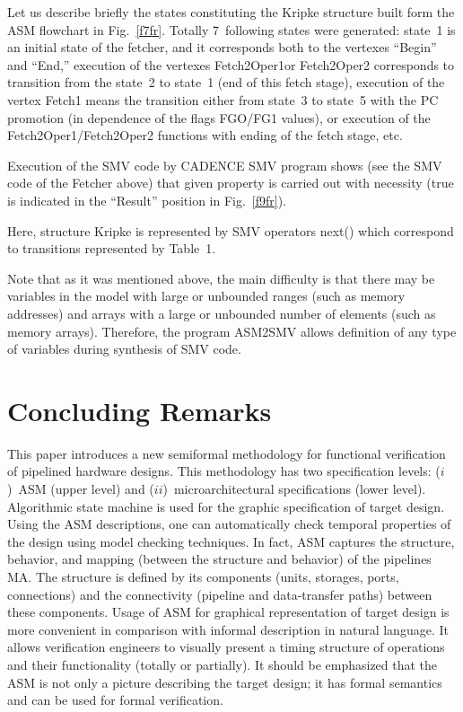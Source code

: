 \begin{multicols}{2}
       Let us describe briefly the states constituting the Kripke structure built form the ASM 
flowchart in Fig.~\ref{f7fr}.  Totally 7~following states were generated: state~1 is an initial state 
of the fetcher, and it corresponds both to the vertexes ``Begin'' and ``End,'' execution of the 
vertexes Fetch2Oper1or Fetch2Oper2 corresponds to transition from the state~2 to state~1 (end 
of this fetch stage), execution of the vertex Fetch1 means the transition either from state~3 to 
state~5 with the PC promotion (in dependence of the flags FGO/FG1 values), or execution of the 
Fetch2Oper1/Fetch2Oper2 functions with ending of the fetch stage, etc.
 
Execution of the SMV code by CADENCE SMV program shows (see the SMV code of the Fetcher above) 
that given property 
is carried out with necessity (true is indicated in the ``Result'' position in Fig.~\ref{f9fr}).  


Here, structure Kripke is represented by SMV operators next() which correspond to transitions 
represented  by Table~1.

Note that as it was mentioned above, the main difficulty is that there may be variables in the 
model with large or unbounded ranges (such as memory addresses) and arrays with a large or 
unbounded number of elements (such as memory arrays). Therefore, the program ASM2SMV 
allows definition of any type of variables during synthesis of SMV code.  

\section{Concluding Remarks}

\noindent   
    This paper introduces a new semiformal methodology for functional verification of 
pipelined hardware designs. This methodology has two specification levels: ($i$)~ASM (upper level) 
and ($ii$)~microarchitectural specifications (lower level). Algorithmic state machine 
is used for the graphic specification of 
target design. Using the ASM descriptions, one can automatically check temporal properties of the 
design using model checking techniques. In fact, ASM captures the structure, behavior, 
and mapping (between the structure and behavior) of the pipelines MA. The 
structure is defined by its components (units, storages, ports, connections) and the connectivity 
(pipeline and data-transfer paths) between these components. Usage of ASM for graphical 
representation of target design is more convenient in comparison with informal description in 
natural language. It allows verification engineers to visually present a timing structure of 
operations and their functionality (totally or partially). It should be emphasized that the ASM is not 
only a picture describing the target design; it has formal semantics and can be used for formal 
verification.



\end{multicols}
